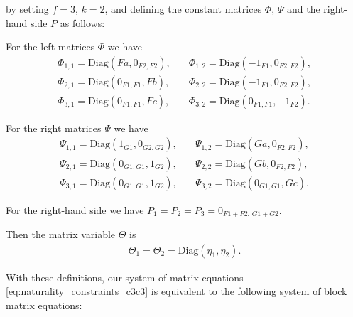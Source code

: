 \begin{example}
by setting $f = 3$, $k = 2$, and defining the constant matrices $\Phi$, $\Psi$ and the right-hand side $P$ as follows:

For the left matrices $\Phi$ we have
\begin{align*}
\Phi_{1,1} = \mathrm{Diag}(Fa, 0_{F2,F2}), &\quad \Phi_{1,2} = \mathrm{Diag}(-1_{F1}, 0_{F2,F2}), \\
\Phi_{2,1} = \mathrm{Diag}(0_{F1,F1}, Fb), &\quad \Phi_{2,2} = \mathrm{Diag}(-1_{F1}, 0_{F2,F2}), \\
\Phi_{3,1} = \mathrm{Diag}(0_{F1,F1}, Fc), &\quad \Phi_{3,2} = \mathrm{Diag}(0_{F1,F1}, -1_{F2}).
\end{align*}

For the right matrices $\Psi$ we have
\begin{align*}
\Psi_{1,1} = \mathrm{Diag}(1_{G1}, 0_{G2,G2}), &\quad \Psi_{1,2} = \mathrm{Diag}(Ga, 0_{F2,F2}), \\
\Psi_{2,1} = \mathrm{Diag}(0_{G1,G1}, 1_{G2}), &\quad \Psi_{2,2} = \mathrm{Diag}(Gb, 0_{F2,F2}), \\
\Psi_{3,1} = \mathrm{Diag}(0_{G1,G1}, 1_{G2}), &\quad \Psi_{3,2} = \mathrm{Diag}(0_{G1,G1}, Gc).
\end{align*}

For the right-hand side we have $P_{1} = P_{2} = P_{3} = 0_{F1+F2,\,G1+G2}$.

Then the matrix variable $\Theta$ is
\begin{align*}
\Theta_{1} = \Theta_{2} = \mathrm{Diag}(\eta_{1}, \eta_{2}).
\end{align*}

With these definitions, our system of matrix equations \eqref{eq:naturality_constraints_c3c3} is equivalent to the following system of
block matrix equations:


\end{example}
